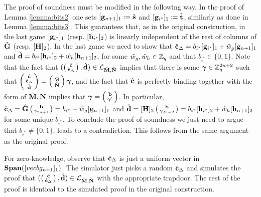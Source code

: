 The proof of soundness must be modified in the following way.  In the proof of Lemma \ref{lemma:bits2} one sets $[\mathbf{g}_{n+1}]_1:={\hat{\mathbf{s}}}$ and $[\mathbf{g}_{i^*}]_1:={\hat{\mathbf{t}}}$, similarly as done in Lemma \ref{lemma:bits3}. This guarantees that, as in the original construction, in the last game  $[\mathbf{g}_{i^*}]_1$ (resp. $[\mathbf{h}_{i^*}]_2$) is linearly independent of the rest of columns of $\hat{\mathbf{{G}}}$ (resp. $[{\mathbf{{H}}}]_2$). In the last game we need to show that ${\hat{\mathbf{c}}}_{\Delta}=b_{i^*}[\mathbf{g}_{i^*}]_1+\tilde{w}_g[\mathbf{g}_{n+1}]_1$ and $\check{\mathbf{d}}=b_{i^*}[\mathbf{h}_{i^*}]_2+\tilde{w}_h[\mathbf{h}_{n+1}]_2$, for some $\tilde{w}_g,\tilde{w}_h\in\mathbb{Z}_q$ and that $b_{i^*} \in \{0,1\}$. Note that the fact that $(\left(\begin{smallmatrix}{\hat{\mathbf{c}}}\\{\hat{\mathbf{c}}}_\Delta\end{smallmatrix}\right), \check{\mathbf{d}})\in\mathcal{L}_{{\hat{\mathbf{{M}}}},\check{\mathbf{{N}}}}$ implies that there is some ${\boldsymbol \gamma}\in\mathbb{Z}_q^{2n+2}$ such that $\left(\begin{smallmatrix}{\hat{\mathbf{c}}}\\{\hat{\mathbf{c}}}_\Delta\\\check{\mathbf{d}}\end{smallmatrix}\right)=\left(\begin{smallmatrix}{\hat{\mathbf{{M}}}}\\\check{\mathbf{{N}}}\end{smallmatrix}\right){\boldsymbol \gamma}$, and the fact that ${\hat{\mathbf{c}}}$ is perfectly binding together with the form of ${\hat{\mathbf{{M}}}},\check{\mathbf{{N}}}$ implies that ${\boldsymbol \gamma}=\left(\begin{smallmatrix}\mathbf{b}\\{\boldsymbol \gamma}'\end{smallmatrix}\right)$. In particular, ${\hat{\mathbf{c}}}_\Delta = \hat{\mathbf{{G}}}\left(\begin{smallmatrix}\mathbf{b}\\\gamma_{2n+1}\end{smallmatrix}\right)=b_{i^*}+\tilde{w}_g[\mathbf{g}_{n+1}]_1$ and $\check{\mathbf{d}}=[{\mathbf{{H}}}]_2\left(\begin{smallmatrix}\mathbf{b}\\\gamma_{2n+2}\end{smallmatrix}\right)=b_{i^*}[\mathbf{h}_{i^*}]_2+\tilde{w}_h[\mathbf{h}_{n+1}]_2$ for some unique $b_{i^*}$. To conclude the proof of soundness we just need to argue that $b_{i^*} \neq \{0,1\}$, leads to a contradiction. This follows from the same argument as the original proof. 


For zero-knowledge, observe that ${\hat{\mathbf{c}}}_{\Delta}$ is just a uniform vector in $\mathbf{Span}([vecb{g}_{n+1}]_1)$. The simulator just picks a random ${\hat{\mathbf{c}}}_{\Delta}$ and simulates the proof that $(\left(\begin{smallmatrix}{\hat{\mathbf{c}}}\\{\hat{\mathbf{c}}}_\Delta\end{smallmatrix}\right), \check{\mathbf{d}})\in\mathcal{L}_{{\hat{\mathbf{{M}}}},\check{\mathbf{{N}}}}$ with the appropriate trapdoor. The rest of the proof is identical to the simulated proof in the original construction.  



